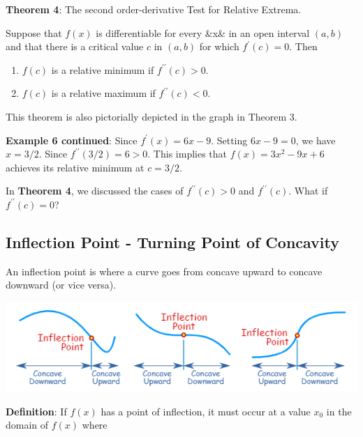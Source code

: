 \documentclass[
]{book}
\begin{document}
\textbf{Theorem 4}: The second order-derivative Test for Relative Extrema.

Suppose that \(f(x)\) is differentiable for every \&x\& in an open interval \((a, b)\) and that there is a critical value \(c\) in \((a, b)\) for which \(f^\prime(c) = 0\). Then

\begin{enumerate}
\def\labelenumi{\arabic{enumi}.}
\item
  \(f(c)\) is a relative minimum if \(f^{\prime\prime}(c) > 0\).
\item
  \(f(c)\) is a relative maximum if \(f^{\prime\prime}(c) < 0\).
\end{enumerate}

This theorem is also pictorially depicted in the graph in Theorem 3.

\textbf{Example 6 continued}: Since \(f^\prime(x) = 6x - 9\). Setting \(6x - 9 = 0\), we have \(x = 3/2\). Since \(f^{\prime\prime}(3/2) = 6 > 0\). This implies that \(f(x) = 3x^2-9x+6\) achieves its relative minimum at \(c = 3/2\).

\hfill\break

In \textbf{Theorem 4}, we discussed the cases of \(f^{\prime\prime}(c) > 0\) and \(f^{\prime\prime}(c)\). What if \(f^{\prime\prime}(c) = 0\)?

\hfill\break

\hypertarget{inflection-point---turning-point-of-concavity}{%
\subsection{Inflection Point - Turning Point of Concavity}\label{inflection-point---turning-point-of-concavity}}

An inflection point is where a curve goes from concave upward to concave downward (or vice versa).

\hfill\break

\begin{center}\includegraphics[width=0.65\linewidth]{img08/w08-InflectionPoint} \end{center}

\hfill\break

\textbf{Definition}: If \(f(x)\) has a point of inflection, it must occur at a value \(x_0\) in the domain of \(f(x)\) where
\end{document}

